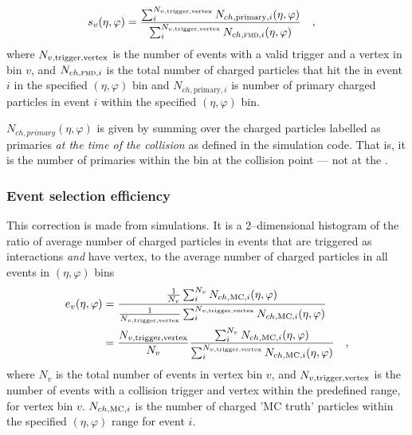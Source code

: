 \documentclass[11pt]{article}
\def\AlwaysText#1{\ifmmode\relax\text{#1}\else #1\fi}
\newcommand{\AbbrName}[1]{\AlwaysText{{\scshape #1}}}
\newcommand{\FMD}[1][]{\AbbrName{fmd\ifx|#1|\else#1\fi}}
\newcommand{\MC}{\AlwaysText{MC}}
\newcommand{\Nsel}{{\ensuremath N_{v,\text{trigger,vertex}}}}
\begin{document}
  \begin{align}
    \label{eq:secondary}
    s_v(\eta,\varphi) &=
    \frac{\sum_i^{\Nsel}N_{ch,\text{primary},i}(\eta,\varphi)}{
      \sum_i^{\Nsel}N_{ch,\text{\FMD{}},i}(\eta,\varphi)}\quad,
  \end{align}
  where $\Nsel$ is the number of events with a valid trigger and a
  vertex in bin $v$, and $N_{ch,\FMD{},i}$ is the total number of
  charged particles that hit the \FMD{} in event $i$ in the specified
  $(\eta,\varphi)$ bin and $N_{ch,\text{primary},i}$ is number of
  primary charged particles in event $i$ within the specified
  $(\eta,\varphi)$ bin.

  $N_{ch,primary}(\eta,\varphi)$ is given by summing over the charged
  particles labelled as primaries \emph{at the time of the collision}
  as defined in the simulation code.  That is, it is the number of
  primaries within the bin at the collision point --- not at the
  \FMD{}.  

\subsubsection{Event selection efficiency}
  This correction is made from simulations.  It is a 2--dimensional
  histogram of the ratio of average number of charged particles in
  events that are triggered as interactions \emph{and} have vertex, to
  the average number of charged particles in all events in
  $(\eta,\varphi)$ bins
  \begin{align}
    \label{eq:event_sel_eff}
    e_{v}(\eta,\varphi) &= 
    \frac{\frac{1}{N_{v}} \sum_{i}^{N_{v}} N_{ch,\MC{},i}(\eta,\varphi)}{
      \frac{1}{\Nsel{}}\sum_{i}^{\Nsel{}}
      N_{ch,\MC{},i}(\eta,\varphi)}\nonumber\\
    &= \frac{\Nsel{}}{N_{v}} \frac{\sum_{i}^{N_{v}} 
      N_{ch,\MC{},i}(\eta,\varphi)}{\sum_{i}^{\Nsel{}}
      N_{ch,\MC{},i}(\eta,\varphi)}\quad,
  \end{align}
  where $N_{v}$ is the total number of events in vertex bin $v$, and
  $\Nsel{}$ is the number of events with a collision trigger and
  vertex within the predefined range, for vertex bin $v$.
  $N_{ch,\MC{},i}$ is the number of charged 'MC truth' particles
  within the specified $(\eta,\varphi)$ range for event $i$.
\end{document}
